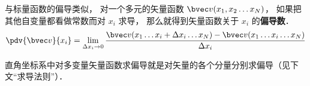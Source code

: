 
与标量函数的偏导类似， 对一个多元的矢量函数 $\bvec v(x_1, x_2\ldots x_N)$， 如果把其他自变量都看做常数而对 $x_i$ 求导， 那么就得到矢量函数关于 $x_i$ 的\textbf{偏导数}．
\begin{equation}
\pdv{\bvec v}{x_i} = \lim_{\Delta x_i \to 0} \frac{\bvec v(x_1 \ldots x_i+\Delta x_i\ldots x_N) -  \bvec v(x_1 \ldots x_i\ldots x_N)}{\Delta x_i}
\end{equation}

直角坐标系中对多变量矢量函数求偏导就是对矢量的各个分量分别求偏导（见下文“求导法则”）．

